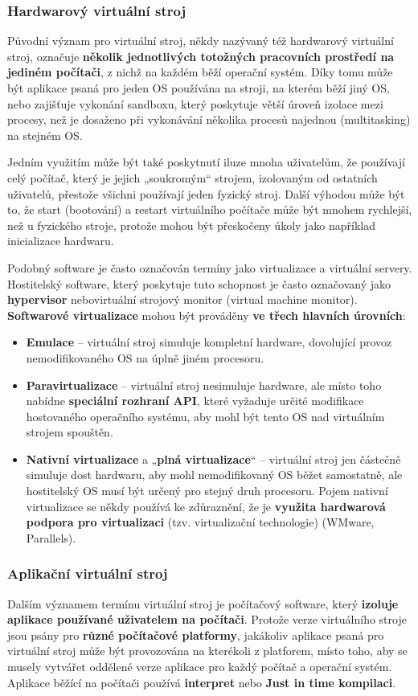 \subsubsection{Hardwarový virtuální stroj}
Původní význam pro virtuální stroj, někdy nazývaný též hardwarový virtuální stroj, označuje \textbf{několik jednotlivých totožných pracovních prostředí na jediném počítači}, z nichž na každém běží operační systém. Díky tomu může být aplikace psaná pro jeden OS používána na stroji, na kterém běží jiný OS, nebo zajišťuje vykonání sandboxu, který poskytuje větší úroveň izolace mezi procesy, než je dosaženo při vykonávání několika procesů najednou (multitasking) na stejném OS.

Jedním využitím může být také poskytnutí iluze mnoha uživatelům, že používají celý počítač, který je jejich „soukromým“ strojem, izolovaným od ostatních uživatelů, přestože všichni používají jeden fyzický stroj. Další výhodou může být to, že start (bootování) a restart virtuálního počítače může být mnohem rychlejší, než u fyzického stroje, protože mohou být přeskočeny úkoly jako například inicializace hardwaru.

Podobný software je často označován termíny jako virtualizace a virtuální servery. Hostitelský software, který poskytuje tuto schopnost je často označovaný jako \textbf{hypervisor} nebovirtuální strojový monitor (virtual machine monitor).
\textbf{Softwarové virtualizace} mohou být prováděny \textbf{ve třech hlavních úrovních}:
\begin{itemize}
\item \textbf{Emulace} -- virtuální stroj simuluje kompletní hardware, dovolující provoz nemodifikovaného OS na úplně jiném procesoru.
\item\textbf{Paravirtualizace} -- virtuální stroj nesimuluje hardware, ale místo toho nabídne \textbf{speciální rozhraní API}, které vyžaduje určité modifikace hostovaného operačního systému, aby mohl být tento OS nad virtuálním strojem spouštěn.
\item\textbf{Nativní virtualizace} a „\textbf{plná virtualizace}“ -- virtuální stroj jen částečně simuluje dost hardwaru, aby mohl nemodifikovaný OS běžet samostatně, ale hostitelský OS musí být určený pro stejný druh procesoru. Pojem nativní virtualizace se někdy používá ke zdůraznění, že je \textbf{využita hardwarová podpora pro virtualizaci} (tzv. virtualizační technologie) (WMware, Parallels).
\end{itemize}

\subsubsection{Aplikační virtuální stroj}
Dalším významem termínu virtuální stroj je počítačový software, který\textbf{ izoluje aplikace používané uživatelem na počítači}. Protože verze virtuálního stroje jsou psány pro \textbf{různé počítačové platformy}, jakákoliv aplikace psaná pro virtuální stroj může být provozována na kterékoli z platforem, místo toho, aby se musely vytvářet oddělené verze aplikace pro každý počítač a operační systém. Aplikace běžící na počítači používá \textbf{interpret} nebo \textbf{Just in time kompilaci}. 

